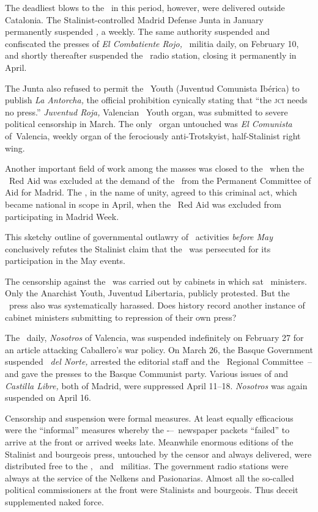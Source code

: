 The deadliest blows to the \POUM\ in this period, however, were delivered outside Catalonia. The Stalinist-controlled Madrid Defense Junta in January permanently suspended \emph{\POUM,} a weekly. The same authority suspended and confiscated the presses of \emph{El Combatiente Rojo,} \POUM\ militia daily, on February 10, and shortly thereafter suspended the \POUM\ radio station, closing it permanently in April.

The Junta also refused to permit the \POUM\ Youth (Juventud Comunista Ib\'erica) to publish \emph{La Antorcha,} the official prohibition cynically stating that ``the \textsc{jci} needs no press.'' \emph{Juventud Roja,} Valencian \POUM\ Youth organ, was submitted to severe political censorship in March. The only \POUM\ organ untouched was \emph{El Comunista} of\kp\ Valencia, weekly organ of the ferociously anti-Trotskyist, half-Stalinist right wing.

Another important field of work among the masses was closed to the \POUM\ when the \POUM\ Red Aid was excluded at the demand of the \PSUC\ from the Permanent Committee of Aid for Madrid. The \CNT\kn, in the name of unity, agreed to this criminal act, which became national in scope in April, when the \POUM\ Red Aid was excluded from participating in Madrid Week.

This sketchy outline of governmental outlawry of \POUM\ activities \emph{before May} conclusively refutes the Stalinist claim that the \POUM\ was persecuted for its participation in the May events.

The censorship against the \POUM\ was carried out by cabinets in which sat \CNT\ ministers. Only the Anarchist Youth, Juventud Libertaria, publicly protested. But the \CNT\ press also was systematically harassed. Does history record another instance of cabinet ministers submitting to repression of their own press?

The \FAI\ daily, \emph{Nosotros} of Valencia, was suspended indefinitely on February 27 for an article attacking Caballero’s war policy. On March 26, the Basque Government suspended \emph{\CNT\ del Norte,} arrested the editorial staff and the \CNT\ Regional Committee~-- and gave the presses to the Basque Communist party. Various issues of \emph{\CNT} and \emph{Castilla Libre,} both of Madrid, were suppressed April 11--18. \emph{Nosotros} was again suspended on April 16.

Censorship and suspension were formal measures. At least equal\-ly efficacious were the ``informal'' measures whereby the \CNT-\FAI--\POUM\ newspaper packets ``failed'' to arrive at the front or arrived weeks late. Meanwhile enormous editions of the Stalinist and bourgeois press, untouched by the censor and always delivered, were distributed free to the \CNT\kn, \UGT\ and \POUM\ militias. The government radio stations were always at the service of the Nelkens and Pasionarias. Almost all the so-called political commissioners at the front were Stalinists and bourgeois. Thus deceit supplemented naked force.

